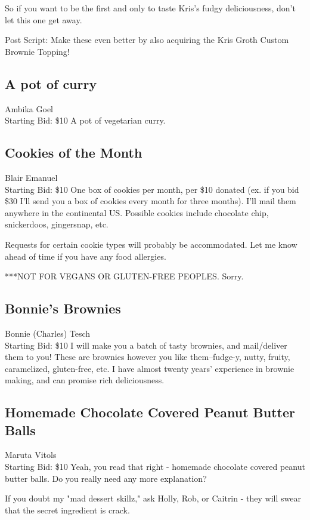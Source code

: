 \documentclass[11pt]{article}
\begin{document}
So if you want to be the first and only to taste Kris's fudgy deliciousness, don't let this one get away.

Post Script: Make these even better by also acquiring the Kris Groth Custom Brownie Topping!
\subsection{A pot of curry}
Ambika Goel
\\
Starting Bid: \$10
\newline
A pot of vegetarian curry.
\subsection{Cookies of the Month}
Blair Emanuel
\\
Starting Bid: \$10
\newline
One box of cookies per month, per \$10 donated (ex. if you bid \$30 I'll send you a box of cookies every month for three months). I'll mail them anywhere in the continental US. Possible cookies include chocolate chip, snickerdoos, gingersnap, etc. 

Requests for certain cookie types will probably be accommodated. Let me know ahead of time if you have any food allergies. 

***NOT FOR VEGANS OR GLUTEN-FREE PEOPLES. Sorry.
\subsection{Bonnie's Brownies}
Bonnie (Charles) Tesch
\\
Starting Bid: \$10
\newline
I will make you a batch of tasty brownies, and mail/deliver them to you! These are brownies however you like them--fudge-y, nutty, fruity, caramelized, gluten-free, etc. I have almost twenty years' experience in brownie making, and can promise rich deliciousness.
\subsection{Homemade Chocolate Covered Peanut Butter Balls}
Maruta Vitols
\\
Starting Bid: \$10
\newline
Yeah, you read that right - homemade chocolate covered peanut butter balls. Do you really need any more explanation?

If you doubt my "mad dessert skillz," ask Holly, Rob, or Caitrin - they will swear that the secret ingredient is crack. 
\end{document}
